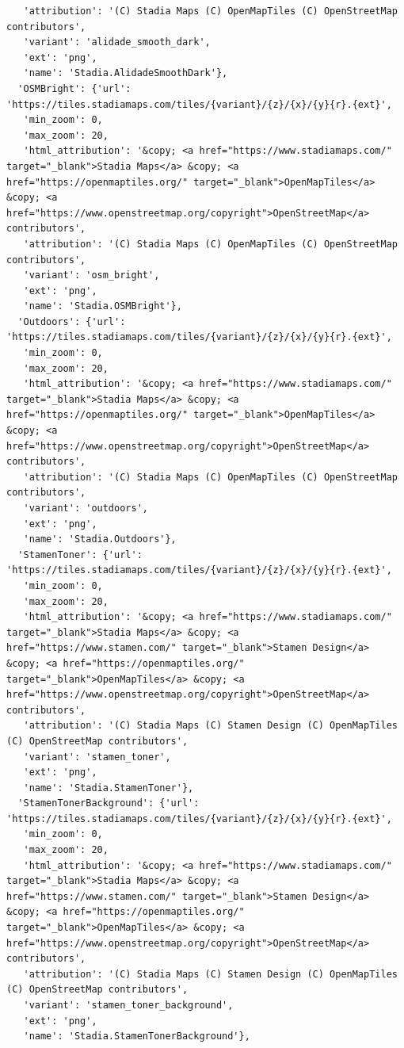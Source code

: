 \documentclass[
  letterpaper,
  DIV=11,
  numbers=noendperiod]{scrreprt}
\begin{document}
\begin{verbatim}
   'attribution': '(C) Stadia Maps (C) OpenMapTiles (C) OpenStreetMap contributors',
   'variant': 'alidade_smooth_dark',
   'ext': 'png',
   'name': 'Stadia.AlidadeSmoothDark'},
  'OSMBright': {'url': 'https://tiles.stadiamaps.com/tiles/{variant}/{z}/{x}/{y}{r}.{ext}',
   'min_zoom': 0,
   'max_zoom': 20,
   'html_attribution': '&copy; <a href="https://www.stadiamaps.com/" target="_blank">Stadia Maps</a> &copy; <a href="https://openmaptiles.org/" target="_blank">OpenMapTiles</a> &copy; <a href="https://www.openstreetmap.org/copyright">OpenStreetMap</a> contributors',
   'attribution': '(C) Stadia Maps (C) OpenMapTiles (C) OpenStreetMap contributors',
   'variant': 'osm_bright',
   'ext': 'png',
   'name': 'Stadia.OSMBright'},
  'Outdoors': {'url': 'https://tiles.stadiamaps.com/tiles/{variant}/{z}/{x}/{y}{r}.{ext}',
   'min_zoom': 0,
   'max_zoom': 20,
   'html_attribution': '&copy; <a href="https://www.stadiamaps.com/" target="_blank">Stadia Maps</a> &copy; <a href="https://openmaptiles.org/" target="_blank">OpenMapTiles</a> &copy; <a href="https://www.openstreetmap.org/copyright">OpenStreetMap</a> contributors',
   'attribution': '(C) Stadia Maps (C) OpenMapTiles (C) OpenStreetMap contributors',
   'variant': 'outdoors',
   'ext': 'png',
   'name': 'Stadia.Outdoors'},
  'StamenToner': {'url': 'https://tiles.stadiamaps.com/tiles/{variant}/{z}/{x}/{y}{r}.{ext}',
   'min_zoom': 0,
   'max_zoom': 20,
   'html_attribution': '&copy; <a href="https://www.stadiamaps.com/" target="_blank">Stadia Maps</a> &copy; <a href="https://www.stamen.com/" target="_blank">Stamen Design</a> &copy; <a href="https://openmaptiles.org/" target="_blank">OpenMapTiles</a> &copy; <a href="https://www.openstreetmap.org/copyright">OpenStreetMap</a> contributors',
   'attribution': '(C) Stadia Maps (C) Stamen Design (C) OpenMapTiles (C) OpenStreetMap contributors',
   'variant': 'stamen_toner',
   'ext': 'png',
   'name': 'Stadia.StamenToner'},
  'StamenTonerBackground': {'url': 'https://tiles.stadiamaps.com/tiles/{variant}/{z}/{x}/{y}{r}.{ext}',
   'min_zoom': 0,
   'max_zoom': 20,
   'html_attribution': '&copy; <a href="https://www.stadiamaps.com/" target="_blank">Stadia Maps</a> &copy; <a href="https://www.stamen.com/" target="_blank">Stamen Design</a> &copy; <a href="https://openmaptiles.org/" target="_blank">OpenMapTiles</a> &copy; <a href="https://www.openstreetmap.org/copyright">OpenStreetMap</a> contributors',
   'attribution': '(C) Stadia Maps (C) Stamen Design (C) OpenMapTiles (C) OpenStreetMap contributors',
   'variant': 'stamen_toner_background',
   'ext': 'png',
   'name': 'Stadia.StamenTonerBackground'},

\end{verbatim}
\end{document}
